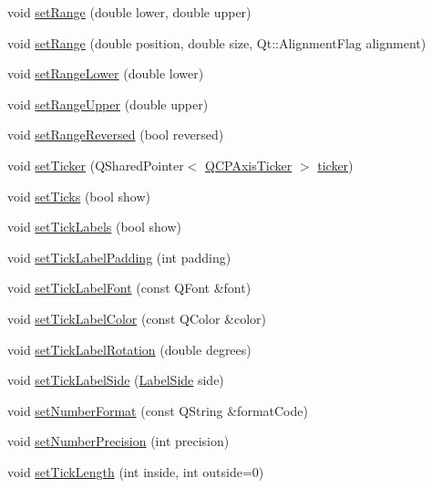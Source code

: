 \begin{DoxyCompactItemize}
\item 
void \hyperlink{classQCPAxis_a57d6ee9e9009fe88cb19db476ec70bca}{set\+Range} (double lower, double upper)
\item 
void \hyperlink{classQCPAxis_acf60e5b2d631fbc8c4548c3d579cb6d0}{set\+Range} (double position, double size, Qt\+::\+Alignment\+Flag alignment)
\item 
void \hyperlink{classQCPAxis_afcf51227d337db28d1a9ce9a4d1bc91a}{set\+Range\+Lower} (double lower)
\item 
void \hyperlink{classQCPAxis_acd3ca1247aa867b540cd5ec30ccd3bef}{set\+Range\+Upper} (double upper)
\item 
void \hyperlink{classQCPAxis_a2172fdb196b1a0dc3f40992fcad8e9e1}{set\+Range\+Reversed} (bool reversed)
\item 
void \hyperlink{classQCPAxis_a4ee03fcd2c74d05cd1a419b9af5cfbdc}{set\+Ticker} (Q\+Shared\+Pointer$<$ \hyperlink{classQCPAxisTicker}{Q\+C\+P\+Axis\+Ticker} $>$ \hyperlink{classQCPAxis_a7b7a27151be8235059e1294f73ecf615}{ticker})
\item 
void \hyperlink{classQCPAxis_ac891409315bc379e3b1abdb162c1a011}{set\+Ticks} (bool show)
\item 
void \hyperlink{classQCPAxis_a04ba16e1f6f78d70f938519576ed32c8}{set\+Tick\+Labels} (bool show)
\item 
void \hyperlink{classQCPAxis_af302c479af9dbc2e9f0e44e07c0012ee}{set\+Tick\+Label\+Padding} (int padding)
\item 
void \hyperlink{classQCPAxis_a2b8690c4e8dbc39d9185d2b398ce7a6c}{set\+Tick\+Label\+Font} (const Q\+Font \&font)
\item 
void \hyperlink{classQCPAxis_a395e445c3fe496b935bee7b911ecfd1c}{set\+Tick\+Label\+Color} (const Q\+Color \&color)
\item 
void \hyperlink{classQCPAxis_a1bddd4413df8a576b7ad4b067fb33375}{set\+Tick\+Label\+Rotation} (double degrees)
\item 
void \hyperlink{classQCPAxis_a13ec644fc6e22715744c92c6dfa4f0fa}{set\+Tick\+Label\+Side} (\hyperlink{classQCPAxis_a24b13374b9b8f75f47eed2ea78c37db9}{Label\+Side} side)
\item 
void \hyperlink{classQCPAxis_ae585a54dc2aac662e90a2ca82f002590}{set\+Number\+Format} (const Q\+String \&format\+Code)
\item 
void \hyperlink{classQCPAxis_a21dc8023ad7500382ad9574b48137e63}{set\+Number\+Precision} (int precision)
\item 
void \hyperlink{classQCPAxis_a62ec40bebe3540e9c1479a8fd2be3b0d}{set\+Tick\+Length} (int inside, int outside=0)

\end{DoxyCompactItemize}
